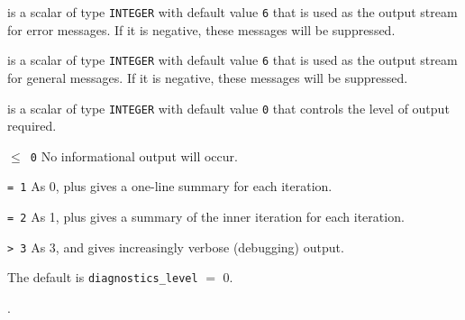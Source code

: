 \documentclass{hslspec}
\begin{document}
\begin{description}

 is a scalar of type {\tt INTEGER} with default value {\tt 6} that
is used as the output stream for error messages. If it is negative, these
messages will be suppressed.  

 is a scalar of type {\tt INTEGER} with default value {\tt 6}
that is used as the output stream for general messages. If it is negative, these messages will be suppressed. 

 is a scalar of type {\tt INTEGER} with default value {\tt 0} that 
controls the level of output required. 
\begin{description} 
\item{\tt $\leq$ 0} No informational output will occur.
\item{\tt = 1} As 0, plus {\color{red} gives a one-line summary for each iteration}.
\item{\tt = 2} As 1, plus {\color{red} gives a summary of the inner iteration for each iteration}.
\item{\tt > 3} As 3, and gives increasingly verbose (debugging) output.
\end{description}
The default is {\tt diagnostics\_level} $=$ 0.
\end{description}

.
\end{document}

